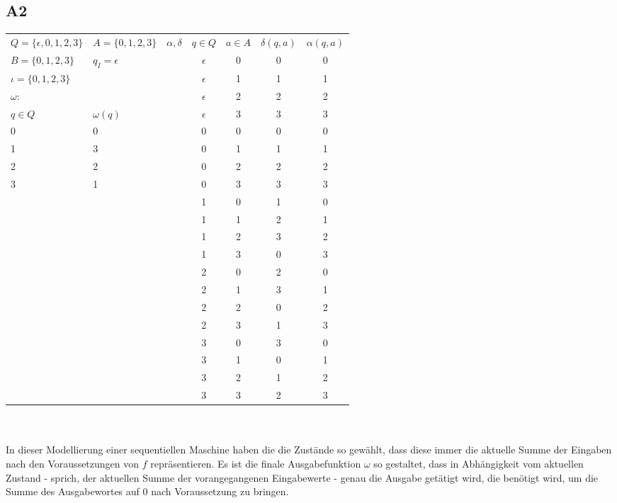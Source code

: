 \documentclass[12pt, a4paper]{article}
\begin{document}
\subsection*{A2}
\begin{tabular}{l l || c c c | c c}
    \( Q = \{ \epsilon, 0, 1, 2, 3 \} \)& \(A = \{0,1,2,3\}\) & \(\alpha, \delta\)&\(q \in Q\)&\(a \in A\)&\(\delta(q,a)\)&\(\alpha(q,a)\)\\
    \( B = \{0,1,2,3\} \) & \(q_I = \epsilon \)&&\(\epsilon\)&0&0&0\\
    \(\iota = \{0,1,2,3\}\)&&&\(\epsilon\)&1&1&1\\
    \(\omega\):&&&\(\epsilon\)&2&2&2\\
    \(q \in Q\) & \(\omega (q) \)&&\(\epsilon\)&3&3&3\\
    0&0&&0&0&0&0\\
    1 & 3&&0&1&1&1\\
    2 & 2&&0&2&2&2\\
    3 & 1&&0&3&3&3\\
    &&&1&0&1&0\\
    &&&1&1&2&1\\
    &&&1&2&3&2\\
    &&&1&3&0&3\\
    &&&2&0&2&0\\
    &&&2&1&3&1\\
    &&&2&2&0&2\\
    &&&2&3&1&3\\
    &&&3&0&3&0\\
    &&&3&1&0&1\\
    &&&3&2&1&2\\
    &&&3&3&2&3\\
\end{tabular}\\\\
In dieser Modellierung einer sequentiellen Maschine haben die die Zustände so gewählt, dass diese immer die aktuelle Summe der Eingaben nach
den Voraussetzungen von \(f\) repräsentieren. Es ist die finale Ausgabefunktion \(\omega\) so gestaltet, dass in Abhängigkeit vom aktuellen
Zustand - sprich, der aktuellen Summe der vorangegangenen Eingabewerte - genau die Ausgabe getätigt wird, die benötigt wird, um die Summe
des Ausgabewortes auf 0 nach Voraussetzung zu bringen.\\
\end{document}

